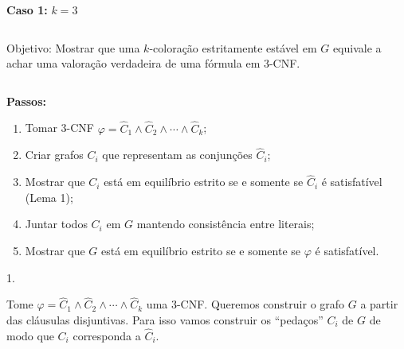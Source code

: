 \documentclass{beamer}
\newcommand{\cls}{\hat{C}}
\theoremstyle{plain}
\begin{document}
\begin{frame}
  \large\textbf{Caso 1:} $k=3$

  \normalsize
  \begin{columns}[t]
    \begin{column}{0.9\textwidth}
      \begin{block}{Objetivo:}
        Mostrar que uma $k$-coloração estritamente estável em $G$ equivale a achar uma valoração
        verdadeira de uma fórmula em 3-CNF\@.
      \end{block}
    \end{column}
  \end{columns}
  \vspace{0.2in}

  \textbf{Passos:}
  \begin{enumerate}
    \item Tomar 3-CNF $\varphi=\cls_1\wedge\cls_2\wedge \cdots\wedge\cls_k$;
    \item Criar grafos $C_i$ que representam as conjunções $\hat{C}_i$;
    \item Mostrar que $C_i$ está em equilíbrio estrito se e somente se $\hat{C}_i$ é satisfatível
      (Lema 1);
    \item Juntar todos $C_i$ em $G$ mantendo consistência entre literais;
    \item Mostrar que $G$ está em equilíbrio estrito se e somente se $\varphi$ é satisfatível.
  \end{enumerate}
\end{frame}

\begin{frame}

  {\color{blue} 1.}

  Tome $\varphi=\cls_1\wedge\cls_2\wedge\cdots\wedge\cls_k$ uma 3-CNF\@. Queremos construir o grafo
  $G$ a partir das cláusulas disjuntivas. Para isso vamos construir os ``pedaços'' $C_i$ de $G$ de
  modo que $C_i$ corresponda a $\cls_i$.
\end{frame}
\end{document}
